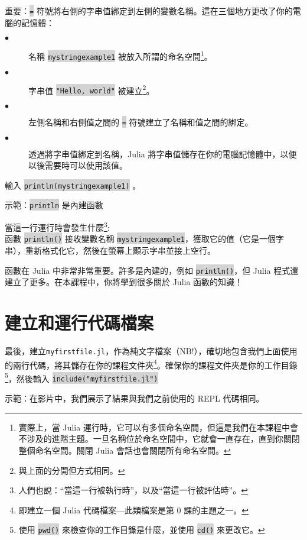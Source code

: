\documentclass[]{article}
\newcommand{\codequote}[1]{\colorbox{lightgray}{\tt #1}}
\begin{document}
重要：\colorbox{lightgray}{\tt =} 符號將右側的字串值綁定到左側的變數名稱。這在三個地方更改了你的電腦的記憶體：
\begin{description}
	\item[$\bullet$] 名稱 \colorbox{lightgray}{\tt mystringexample1} 被放入所謂的命名空間\footnote{實際上，當 Julia 運行時，它可以有多個命名空間，但這是我們在本課程中會不涉及的進階主題。一旦名稱位於命名空間中，它就會一直存在，直到你關閉整個命名空間。關閉 Julia 會話也會關閉所有命名空間。}。
  \item[$\bullet$] 字串值 \colorbox{lightgray}{\tt "Hello, world"} 被建立\footnote{ 與上面的分開但方式相同。}。
  \item[$\bullet$] 左側名稱和右側值之間的 \colorbox{lightgray}{\tt =} 符號建立了名稱和值之間的綁定。
 \item[$\bullet$] 透過將字串值綁定到名稱，Julia 將字串值儲存在你的電腦記憶體中，以便以後需要時可以使用該值。
\end{description}

\begin{minipage}{7cm}
輸入 \colorbox{lightgray}{\tt println(mystringexample1)} 。
\end{minipage}
\hspace{4em} \begin{minipage}{7cm}
	示範：\codequote{println} 是內建函數
\end{minipage}

當這一行運行時會發生什麼\footnote{人們也說：``當這一行被執行時''，以及``當這一行被評估時''。}:\\
函數 \colorbox{lightgray}{\tt println()} 接收變數名稱 \colorbox{lightgray}{\tt mystringexample1}，獲取它的值（它是一個字串），重新格式化它，然後在螢幕上顯示字串並接上空行。

函數在 Julia 中非常非常重要。許多是內建的，例如 \colorbox{lightgray}{\tt println()}，但 Julia 程式還建立了更多。在本課程中，你將學到很多關於 Julia 函數的知識！

\section*{建立和運行代碼檔案}

\begin{minipage}[t]{10.5cm}
	最後，建立{\tt myfirstfile.jl}，作為純文字檔案（NB!），確切地包含我們上面使用的兩行代碼，將其儲存在你的課程文件夾\footnote{即建立一個 Julia 代碼檔案---此類檔案是第 0 課的主題之一。}。確保你的課程文件夾是你的工作目錄\footnote{使用 \colorbox{lightgray}{\tt pwd()} 來檢查你的工作目錄是什麼，並使用 \colorbox{lightgray}{\tt cd()} 來更改它。}，然後輸入 \colorbox{lightgray}{\tt include("myfirstfile.jl")}
	\end{minipage}
\hspace{4em} \begin{minipage}[t]{4.5cm}
示範：在影片中，我們展示了結果與我們之前使用的 REPL 代碼相同。
\end{minipage}
\end{document}
